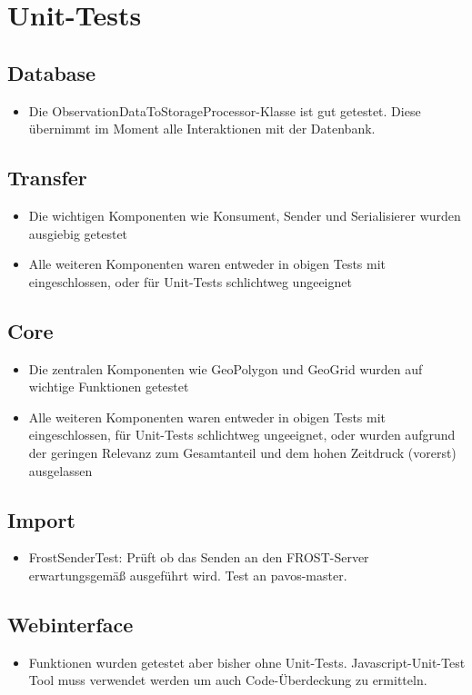 \chapter{Unit-Tests}

\section{Database}
\begin{itemize}
	\item Die ObservationDataToStorageProcessor-Klasse ist gut getestet. Diese übernimmt im Moment alle Interaktionen mit der Datenbank.
\end{itemize}

\section{Transfer}
\begin{itemize}
	\item Die wichtigen Komponenten wie Konsument, Sender und Serialisierer wurden ausgiebig getestet
	\item Alle weiteren Komponenten waren entweder in obigen Tests mit eingeschlossen, oder für Unit-Tests schlichtweg ungeeignet
\end{itemize}

\section{Core}
\begin{itemize}
	\item Die zentralen Komponenten wie GeoPolygon und GeoGrid wurden auf wichtige Funktionen getestet
	\item Alle weiteren Komponenten waren entweder in obigen Tests mit eingeschlossen, für Unit-Tests schlichtweg ungeeignet, oder wurden aufgrund der geringen Relevanz zum Gesamtanteil und dem hohen Zeitdruck (vorerst) ausgelassen
\end{itemize}

\section{Import}
\begin{itemize}
	\item FrostSenderTest: Prüft ob das Senden an den FROST-Server erwartungsgemäß ausgeführt wird. Test an pavos-master.
\end{itemize}

\section{Webinterface}
\begin{itemize}
	\item Funktionen wurden getestet aber bisher ohne Unit-Tests. Javascript-Unit-Test Tool muss verwendet werden um auch Code-Überdeckung zu ermitteln.
\end{itemize}